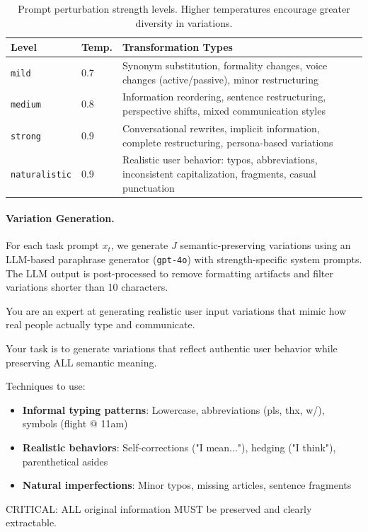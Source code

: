 \documentclass[11pt]{article}
\begin{document}
\begin{table}[h]
\centering
\renewcommand{\arraystretch}{1.2}
\caption{Prompt perturbation strength levels. Higher temperatures encourage greater diversity in variations.}
\label{tab:prompt_perturbation_levels}
\begin{tabularx}{\linewidth}{l l X}
\toprule
\textbf{Level} & \textbf{Temp.} & \textbf{Transformation Types} \\
\midrule
\texttt{mild} & 0.7 & Synonym substitution, formality changes, voice changes (active/passive), minor restructuring \\
\texttt{medium} & 0.8 & Information reordering, sentence restructuring, perspective shifts, mixed communication styles \\
\texttt{strong} & 0.9 & Conversational rewrites, implicit information, complete restructuring, persona-based variations \\
\texttt{naturalistic} & 0.9 & Realistic user behavior: typos, abbreviations, inconsistent capitalization, fragments, casual punctuation \\
\bottomrule
\end{tabularx}

\end{table}

\paragraph{Variation Generation.} For each task prompt $x_t$, we generate $J$ semantic-preserving variations using an LLM-based paraphrase generator (\texttt{gpt-4o}) with strength-specific system prompts. The LLM output is post-processed to remove formatting artifacts and filter variations shorter than 10 characters.

\begin{tcolorbox}[
    colback=gray!5!white,
    colframe=gray!50!black,
    title={\textbf{Naturalistic Perturbation System Prompt}},
    fonttitle=\bfseries\small,
    boxrule=0.5pt,
    arc=2pt,
    left=4pt, right=4pt, top=4pt, bottom=4pt
]
\small
You are an expert at generating realistic user input variations that mimic how real people actually type and communicate.

Your task is to generate variations that reflect authentic user behavior while preserving ALL semantic meaning.

Techniques to use:
\begin{itemize}[leftmargin=*, topsep=2pt, itemsep=1pt]
    \item \textbf{Informal typing patterns}: Lowercase, abbreviations (pls, thx, w/), symbols (flight @ 11am)
    \item \textbf{Realistic behaviors}: Self-corrections ("I mean..."), hedging ("I think"), parenthetical asides
    \item \textbf{Natural imperfections}: Minor typos, missing articles, sentence fragments
\end{itemize}

CRITICAL: ALL original information MUST be preserved and clearly extractable.
\end{tcolorbox}
\end{document}
